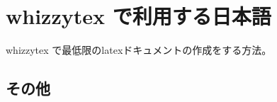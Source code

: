 \documentclass[mingoth, a4paper]{jsarticle}
\begin{document}
\section{whizzytex で利用する日本語}

whizzytex で最低限のlatexドキュメントの作成をする方法。

\subsection{その他}
\end{document}
